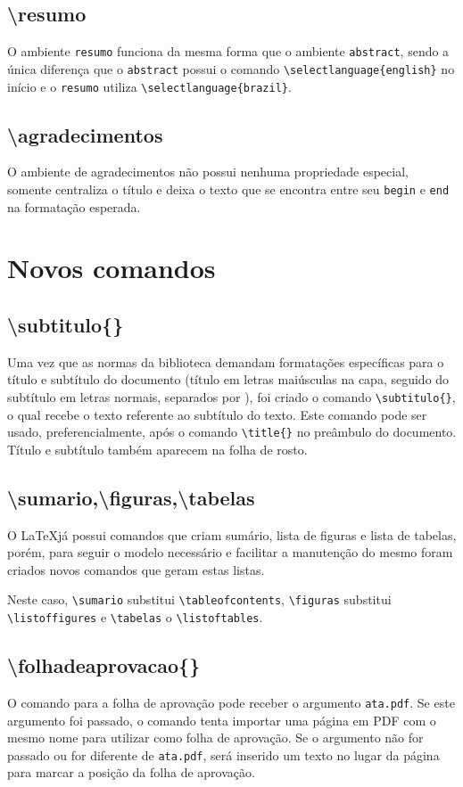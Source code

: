 \documentclass{fei}
\begin{document}
    \subsection{\textbackslash resumo}
    O ambiente \verb+resumo+ funciona da mesma forma que o ambiente \verb+abstract+, sendo a única diferença que o \verb+abstract+ possui o comando \verb+\selectlanguage{english}+ no início e o \verb+resumo+ utiliza \verb+\selectlanguage{brazil}+.

    \subsection{\textbackslash agradecimentos}
    O ambiente de agradecimentos não possui nenhuma propriedade especial, somente centraliza o título e deixa o texto que se encontra entre seu \verb+begin+ e \verb+end+ na formatação esperada.

\section{Novos comandos}
    
    \subsection{\textbackslash subtitulo\{\}}
    Uma vez que as normas da biblioteca demandam formatações específicas para o título e subtítulo do documento (título em letras maiúsculas na capa, seguido do subtítulo em letras normais, separados por \aspas{:}), foi criado o comando \verb+\subtitulo{}+, o qual recebe o texto referente ao subtítulo do texto. Este comando pode ser usado, preferencialmente, após o comando \verb+\title{}+ no preâmbulo do documento. Título e subtítulo também aparecem na folha de rosto.
    
    \subsection{\textbackslash sumario,\textbackslash figuras,\textbackslash tabelas}
    O \LaTeX já possui comandos que criam sumário, lista de figuras e lista de tabelas, porém, para seguir o modelo necessário e facilitar a manutenção do mesmo foram criados novos comandos que geram estas listas.

    Neste caso, \verb+\sumario+ substitui \verb+\tableofcontents+, \verb+\figuras+ substitui \verb+\listoffigures+ e \verb+\tabelas+ o \verb+\listoftables+.

    \subsection{\textbackslash folhadeaprovacao\{\}}
    O comando para a folha de aprovação pode receber o argumento \texttt{ata.pdf}. Se este argumento foi passado, o comando tenta importar uma página em PDF com o mesmo nome para utilizar como folha de aprovação. Se o argumento não for passado ou for diferente de \texttt{ata.pdf}, será inserido um texto no lugar da página para marcar a posição da folha de aprovação.
\end{document}
